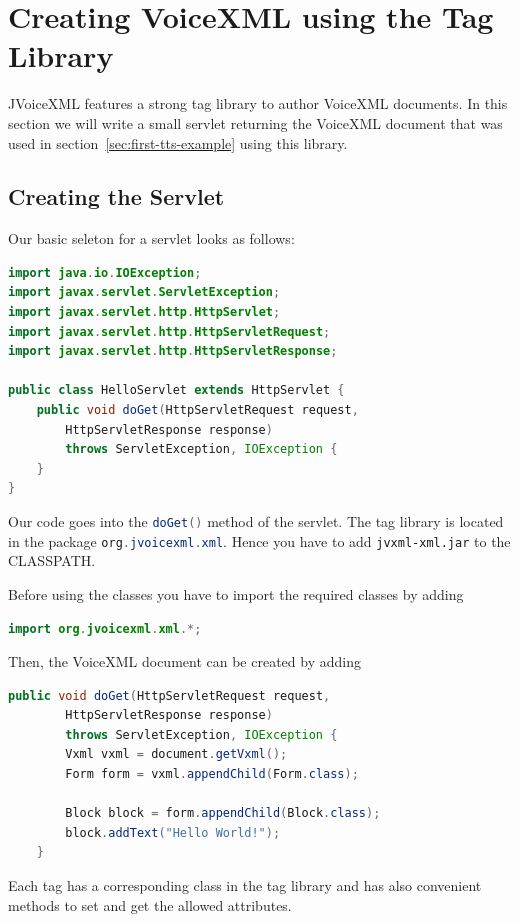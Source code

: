 \documentclass[11pt,a4paper]{book}
\begin{document}
\section{Creating VoiceXML using the Tag Library}

JVoiceXML features a strong tag library to author VoiceXML documents. In
this section we will write a small servlet returning the VoiceXML document that
was used in section~\ref{sec:first-tts-example} using this library.

\subsection{Creating the Servlet}

Our basic seleton for a servlet looks as follows:

\begin{lstlisting}[language=Java]
import java.io.IOException;
import javax.servlet.ServletException;
import javax.servlet.http.HttpServlet;
import javax.servlet.http.HttpServletRequest;
import javax.servlet.http.HttpServletResponse;

public class HelloServlet extends HttpServlet {
    public void doGet(HttpServletRequest request,
        HttpServletResponse response)
        throws ServletException, IOException {
    }
}
\end{lstlisting}

Our code goes into the \lstinline[language=Java]{doGet()} method of the servlet. The tag library
is located in the package \lstinline[language=Java]{org.jvoicexml.xml}. Hence you have to add
\texttt{jvxml-xml.jar} to the CLASSPATH.

Before using the classes you have to import the required classes by adding
\begin{lstlisting}[language=Java]
import org.jvoicexml.xml.*;
\end{lstlisting}

Then, the VoiceXML document can be created by adding
\begin{lstlisting}[language=Java]
    public void doGet(HttpServletRequest request,
        HttpServletResponse response)
        throws ServletException, IOException {
        Vxml vxml = document.getVxml();
        Form form = vxml.appendChild(Form.class);

        Block block = form.appendChild(Block.class);
        block.addText("Hello World!");
    }
\end{lstlisting}

Each tag has a corresponding class in the tag library and has also convenient
methods to set and get the allowed attributes.
\end{document}
